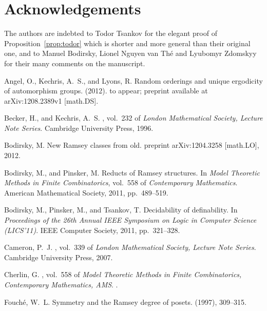 \documentclass[12pt]{amsart}
\theoremstyle{plain}
\theoremstyle{definition}
\begin{document}
\section{Acknowledgements} The authors are indebted to Todor Tsankov for the elegant proof of Proposition~\ref{prop:todor} which is shorter and more general than their original one, and to Manuel Bodirsky, Lionel Nguyen van Th\'{e} and Lyubomyr Zdomskyy for their many comments on the manuscript.


\begin{thebibliography}{10}

{\sc Angel, O., Kechris, A.~S., and Lyons, R.}
\newblock Random orderings and unique ergodicity of automorphism groups.
 (2012).
\newblock to appear; preprint available at arXiv:1208.2389v1 [math.DS].

{\sc Becker, H., and Kechris, A.~S.}
, vol.~232 of
  {\em London Mathematical Society, Lecture Note Series}.
\newblock Cambridge University Press, 1996.

{\sc Bodirsky, M.}
\newblock New {R}amsey classes from old.
\newblock preprint arXiv:1204.3258 [math.LO], 2012.

{\sc Bodirsky, M., and Pinsker, M.}
\newblock Reducts of {R}amsey structures.
\newblock In {\em Model Theoretic Methods in Finite Combinatorics}, vol.~558 of
  {\em Contemporary Mathematics}. American Mathematical Society, 2011,
  pp.~489--519.

{\sc Bodirsky, M., Pinsker, M., and Tsankov, T.}
\newblock Decidability of definability.
\newblock In {\em Proceedings of the 26th Annual IEEE Symposium on Logic in
  Computer Science (LICS'11)}. IEEE Computer Society, 2011, pp.~321--328.

{\sc Cameron, P.~J.}
, vol.~339 of {\em London
  Mathematical Society, Lecture Note Series}.
\newblock Cambridge University Press, 2007.

{\sc Cherlin, G.}
, vol.~558 of
  {\em Model Theoretic Methods in Finite Combinatorics, Contemporary
  Mathematics, AMS}.
.

{\sc Fouch\'e, W.~L.}
\newblock Symmetry and the {R}amsey degree of posets.
 (1997), 309--315.


\end{thebibliography}
\end{document}
